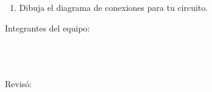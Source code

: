 	\begin{enumerate}
		\item Dibuja el diagrama de conexiones para tu circuito. \newline \newline \newline \newline \newline \newline \newline \newline \newline \newline \newline \newline \newline \newline \newline \newline \newline \newline \newline \newline \newline \newline \newline \newline \newline \newline \newline \newline
	\end{enumerate}

	Integrantes del equipo: \\[0.2cm]
	\horrule{0.5pt} \\[0.2cm] %
	\horrule{0.5pt} \\[0.2cm] %
	\horrule{0.5pt} \\[0.2cm] %
	\horrule{0.5pt} %

	Revisó: \\[0.2cm]
	\horrule{0.5pt} \\%
    

